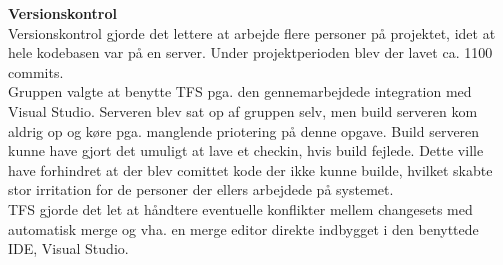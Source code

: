 

\textbf{Versionskontrol}\\  %
Versionskontrol gjorde det lettere at arbejde flere personer på projektet, idet at hele kodebasen var på en server. Under projektperioden blev der lavet ca. 1100 commits.\\

Gruppen valgte at benytte TFS pga. den gennemarbejdede integration med Visual Studio. Serveren blev sat op af gruppen selv, men build serveren kom aldrig op og køre pga. manglende priotering på denne opgave. Build serveren kunne have gjort det umuligt at lave et checkin, hvis build fejlede. Dette ville have forhindret at der blev comittet kode der ikke kunne builde, hvilket skabte stor irritation for de personer der ellers arbejdede på systemet.\\

TFS gjorde det let at håndtere eventuelle konflikter mellem changesets med automatisk merge og vha. en merge editor direkte indbygget i den benyttede IDE, Visual Studio.\\

